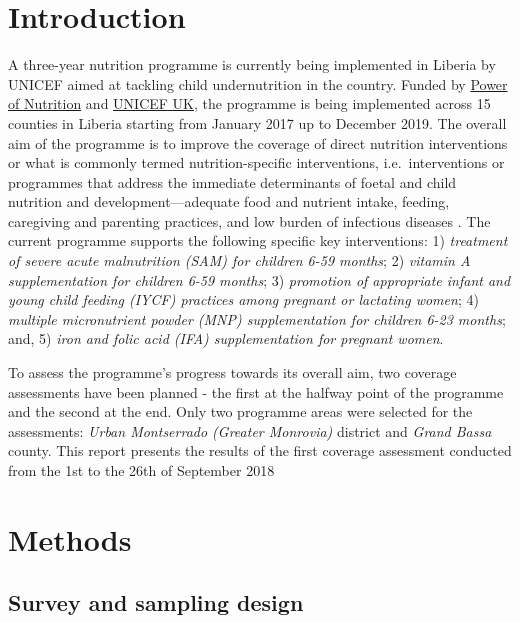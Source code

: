 \documentclass[12pt,a4paper]{article}
\theoremstyle{definition}
\theoremstyle{definition}
\theoremstyle{definition}
\theoremstyle{remark}
\begin{document}
\newpage

\hypertarget{introduction}{%
\section{Introduction}\label{introduction}}

A three-year nutrition programme is currently being implemented in
Liberia by UNICEF aimed at tackling child undernutrition in the country.
Funded by \href{http://www.powerofnutrition.org}{Power of Nutrition} and
\href{https://www.unicef.org.uk}{UNICEF UK}, the programme is being
implemented across 15 counties in Liberia starting from January 2017 up
to December 2019. The overall aim of the programme is to improve the
coverage of direct nutrition interventions or what is commonly termed
nutrition-specific interventions, i.e.~interventions or programmes that
address the immediate determinants of foetal and child nutrition and
development---adequate food and nutrient intake, feeding, caregiving and
parenting practices, and low burden of infectious diseases
\citep[\citet{Ruel:2013kr}]{Bhutta:2013ks}. The current programme
supports the following specific key interventions: 1) \emph{treatment of
severe acute malnutrition (SAM) for children 6-59 months}; 2)
\emph{vitamin A supplementation for children 6-59 months}; 3)
\emph{promotion of appropriate infant and young child feeding (IYCF)
practices among pregnant or lactating women}; 4) \emph{multiple
micronutrient powder (MNP) supplementation for children 6-23 months};
and, 5) \emph{iron and folic acid (IFA) supplementation for pregnant
women}.

To assess the programme's progress towards its overall aim, two coverage
assessments have been planned - the first at the halfway point of the
programme and the second at the end. Only two programme areas were
selected for the assessments: \emph{Urban Montserrado (Greater
Monrovia)} district and \emph{Grand Bassa} county. This report presents
the results of the first coverage assessment conducted from the 1st to
the 26th of September 2018

\hypertarget{methods}{%
\section{Methods}\label{methods}}

\hypertarget{survey-and-sampling-design}{%
\subsection{Survey and sampling
design}\label{survey-and-sampling-design}}
\end{document}
